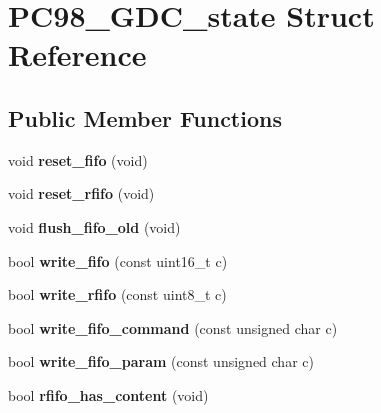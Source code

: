 \hypertarget{structPC98__GDC__state}{\section{P\-C98\-\_\-\-G\-D\-C\-\_\-state Struct Reference}
\label{structPC98__GDC__state}
}
\subsection*{Public Member Functions}
\begin{DoxyCompactItemize}
\item 
\hypertarget{structPC98__GDC__state_a7973469db8c58471cd105cc5f2513bb1}{void {\bfseries reset\-\_\-fifo} (void)}\label{structPC98__GDC__state_a7973469db8c58471cd105cc5f2513bb1}

\item 
\hypertarget{structPC98__GDC__state_a4836b9d30ad97c0d491c628c493a31a3}{void {\bfseries reset\-\_\-rfifo} (void)}\label{structPC98__GDC__state_a4836b9d30ad97c0d491c628c493a31a3}

\item 
\hypertarget{structPC98__GDC__state_a0eab727dd82dfad6c340daaa337f442d}{void {\bfseries flush\-\_\-fifo\-\_\-old} (void)}\label{structPC98__GDC__state_a0eab727dd82dfad6c340daaa337f442d}

\item 
\hypertarget{structPC98__GDC__state_af404e360236ebfe30003bd00761e7eb1}{bool {\bfseries write\-\_\-fifo} (const uint16\-\_\-t c)}\label{structPC98__GDC__state_af404e360236ebfe30003bd00761e7eb1}

\item 
\hypertarget{structPC98__GDC__state_a5804308454ffab7cbbe1dd1103794f3a}{bool {\bfseries write\-\_\-rfifo} (const uint8\-\_\-t c)}\label{structPC98__GDC__state_a5804308454ffab7cbbe1dd1103794f3a}

\item 
\hypertarget{structPC98__GDC__state_a19867db16d1d33edb3cec74c9c8596cd}{bool {\bfseries write\-\_\-fifo\-\_\-command} (const unsigned char c)}\label{structPC98__GDC__state_a19867db16d1d33edb3cec74c9c8596cd}

\item 
\hypertarget{structPC98__GDC__state_aedfc62f64c943388975adedbc30458bf}{bool {\bfseries write\-\_\-fifo\-\_\-param} (const unsigned char c)}\label{structPC98__GDC__state_aedfc62f64c943388975adedbc30458bf}

\item 
\hypertarget{structPC98__GDC__state_ad34b46692e4fe7b2bc059509a5b465af}{bool {\bfseries rfifo\-\_\-has\-\_\-content} (void)}\label{structPC98__GDC__state_ad34b46692e4fe7b2bc059509a5b465af}


\end{DoxyCompactItemize}
